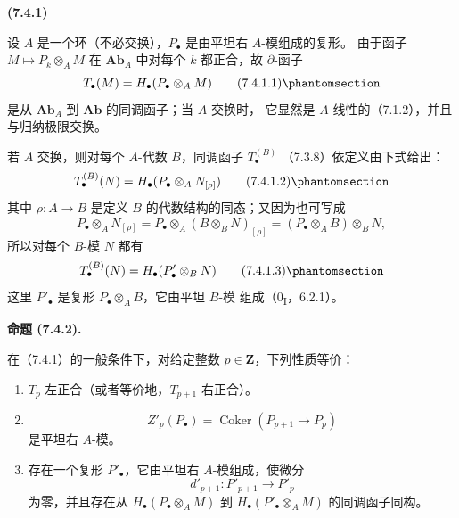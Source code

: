 \documentclass[UTF8,fontset=none,11pt,oneside,openany]{ctexbook}
\newenvironment{env}[1][]{%
  \par\medskip\noindent\textbf{(#1)}\ %
}{\par}
\newenvironment{proposition}[1][]{%
  \par\medskip\noindent\textbf{命题 (#1).}\ %
}{\par}
\newcommand{\oldpage}[2][]{%
  \hypertarget{ega-source-page-#1-#2}{}%
  \marginnote{\scriptsize\textbf{#1}~|~#2}\ignorespaces}
\let\EGAOriginalLabel\label
\renewcommand{\label}[1]{\phantomsection\EGAOriginalLabel{#1}}
\begin{document}
\begin{env}[7.4.1]
设 $A$ 是一个环（不必交换），$P_\bullet$ 是由平坦右 $A$-模组成的复形。
由于函子 $M\mapsto P_k\otimes_A M$ 在 $\mathbf{Ab}_A$ 中对每个 $k$
都正合，故 $\partial$-函子
\[
  T_\bullet(M)=H_\bullet(P_\bullet\otimes_A M)
  \tag{7.4.1.1}\label{III.7.4.1.1.fr}
\]
\oldpage[III]{186}
是从 $\mathbf{Ab}_A$ 到 $\mathbf{Ab}$ 的同调函子；当 $A$ 交换时，
它显然是 $A$-线性的（7.1.2），并且与归纳极限交换。

若 $A$ 交换，则对每个 $A$-代数 $B$，同调函子 $T_\bullet^{(B)}$
（7.3.8）依定义由下式给出：
\[
  T_\bullet^{(B)}(N)
  =
  H_\bullet(P_\bullet\otimes_A N_{[\rho]})
  \tag{7.4.1.2}\label{III.7.4.1.2.fr}
\]
其中 $\rho:A\to B$ 是定义 $B$ 的代数结构的同态；又因为也可写成
\[
  P_\bullet\otimes_A N_{[\rho]}
  =P_\bullet\otimes_A(B\otimes_B N)_{[\rho]}
  =(P_\bullet\otimes_A B)\otimes_B N,
\]
所以对每个 $B$-模 $N$ 都有
\[
  T_\bullet^{(B)}(N)=H_\bullet(P'_\bullet\otimes_B N)
  \tag{7.4.1.3}\label{III.7.4.1.3.fr}
\]
这里 $P'_\bullet$ 是复形 $P_\bullet\otimes_A B$，它由平坦 $B$-模
组成（0\textsubscript{I}，6.2.1）。
\end{env}

\begin{proposition}[7.4.2]
在（7.4.1）的一般条件下，对给定整数 $p\in\mathbf Z$，下列性质等价：
\begin{enumerate}
  \item[a)] $T_p$ 左正合（或者等价地，$T_{p+1}$ 右正合）。
  \item[b)]
    \[
      Z'_p(P_\bullet)
      =
      \operatorname{Coker}(P_{p+1}\longrightarrow P_p)
    \]
    是平坦右 $A$-模。
  \item[c)] 存在一个复形 $P'_\bullet$，它由平坦右 $A$-模组成，使微分
    \[
      d'_{p+1}:P'_{p+1}\longrightarrow P'_p
    \]
    为零，并且存在从 $H_\bullet(P_\bullet\otimes_A M)$ 到
    $H_\bullet(P'_\bullet\otimes_A M)$ 的同调函子同构。
\end{enumerate}
\end{proposition}
\end{document}
